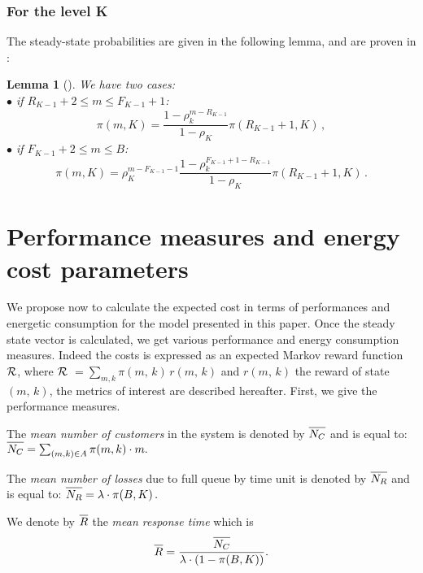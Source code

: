 \documentclass[conference]{IEEEtran}
\newtheorem{lem}{Lemma}
\begin{document}
\subsubsection{For the level K}
The steady-state probabilities are given in the following lemma, and are proven 
in \cite{le2000simple}:
\begin{lem}[\cite{le2000simple}]
We have two cases:\\
$\bullet$ if $R_{K-1}+2 \leq m \leq F_{K-1}+1 $:
\begin{equation}
\pi(m,K)=\frac{1-\rho_k^{m-R_{K-1}}}{1-\rho_K} \pi(R_{K-1}+1,K) \, ,
\label{eq60}
\end{equation}
$\bullet$ if $F_{K-1}+2 \leq m \leq B$:
\begin{equation}
\pi(m,K)=\rho_K^{m-F_{K-1}-1} \frac{1-\rho_k^{F_{K-1}+1-R_{K-1}}}{1-\rho_K} \pi(R_{K-1}+1,K) \, .
\label{eq61}
\end{equation}
\end{lem}


\section{Performance measures and energy cost parameters}
\label{sec:ParamPerf}

We propose now to calculate the expected cost in terms of performances and energetic consumption
for the model presented in this paper.  Once the steady state vector is calculated, we get various performance and energy consumption measures.  
Indeed the costs is expressed as an expected Markov reward
function $\cal{R}$, where $\cal{R}$ $=\sum_{m,k}\pi(m,\,k) \,r(m,\,k)$  and 
$r(m,\,k)$ the reward of state $(m,\,k)$, the  metrics of interest are described hereafter. 
First, we give the performance measures.


The \emph{mean number of customers} in the system is denoted by $\overline{\mathstrut N_{C}}$ and is equal to:
\(
\overline{\mathstrut N_{C}}=\sum_{(m,k) \in A} \pi(m,k) \cdot m.
\)

The \emph{mean number of losses} due to full queue by time unit 
is denoted by $\overline{\mathstrut N_{R}}$ and is equal to:
\(
    \overline{\mathstrut N_{R}}=\lambda \cdot \pi(B,K) \, .
\)

We denote by $\overline{\mathstrut R}$ the \emph{mean response time} which is
\begin{equation*}
    \overline{\mathstrut R}=\frac{\overline{\mathstrut N_{C}}}{\lambda \cdot (1-\pi(B,K))}.
\end{equation*}
\end{document}
